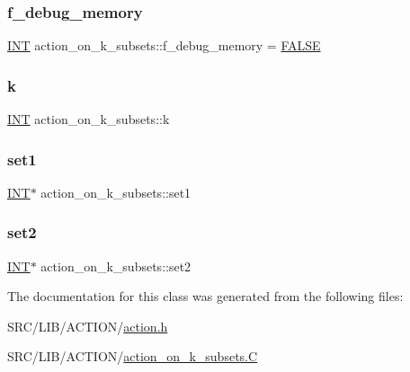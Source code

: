 \subsubsection{\texorpdfstring{f\+\_\+debug\+\_\+memory}{f\_debug\_memory}}
{\footnotesize\ttfamily \mbox{\hyperlink{galois_8h_a09fddde158a3a20bd2dcadb609de11dc}{I\+NT}} action\+\_\+on\+\_\+k\+\_\+subsets\+::f\+\_\+debug\+\_\+memory = \mbox{\hyperlink{nauty_8h_aa93f0eb578d23995850d61f7d61c55c1}{F\+A\+L\+SE}}\hspace{0.3cm}{\ttfamily [static]}}

\mbox{\label{classaction__on__k__subsets_af03f2c37ce7e6084da384d9785794e67}} 
\subsubsection{\texorpdfstring{k}{k}}
{\footnotesize\ttfamily \mbox{\hyperlink{galois_8h_a09fddde158a3a20bd2dcadb609de11dc}{I\+NT}} action\+\_\+on\+\_\+k\+\_\+subsets\+::k}

\mbox{\label{classaction__on__k__subsets_a432abf72a8565f7dc6640bd6f3a837d3}} 
\subsubsection{\texorpdfstring{set1}{set1}}
{\footnotesize\ttfamily \mbox{\hyperlink{galois_8h_a09fddde158a3a20bd2dcadb609de11dc}{I\+NT}}$\ast$ action\+\_\+on\+\_\+k\+\_\+subsets\+::set1}

\mbox{\label{classaction__on__k__subsets_a4f0ca560067f182834c2e5a798de243c}} 
\subsubsection{\texorpdfstring{set2}{set2}}
{\footnotesize\ttfamily \mbox{\hyperlink{galois_8h_a09fddde158a3a20bd2dcadb609de11dc}{I\+NT}}$\ast$ action\+\_\+on\+\_\+k\+\_\+subsets\+::set2}



The documentation for this class was generated from the following files\+:\begin{DoxyCompactItemize}
\item 
S\+R\+C/\+L\+I\+B/\+A\+C\+T\+I\+O\+N/\mbox{\hyperlink{action_8h}{action.\+h}}\item 
S\+R\+C/\+L\+I\+B/\+A\+C\+T\+I\+O\+N/\mbox{\hyperlink{action__on__k__subsets_8_c}{action\+\_\+on\+\_\+k\+\_\+subsets.\+C}}\end{DoxyCompactItemize}
